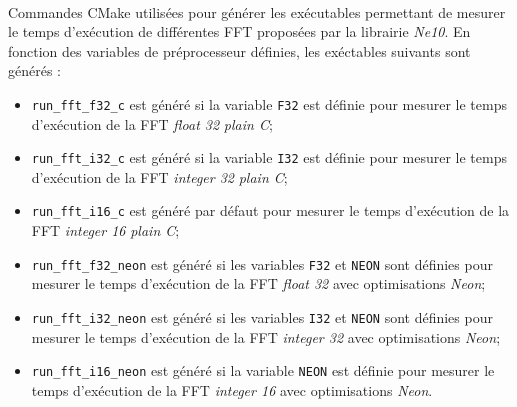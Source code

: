 \documentclass{article}
\begin{document}
\paragraph{}
Commandes CMake utilisées pour générer les exécutables permettant de mesurer le temps d'exécution de différentes FFT proposées par la librairie \emph{Ne10}. En fonction des variables de préprocesseur définies, les exéctables suivants sont générés :
\begin{itemize}
    \item \texttt{run\_fft\_f32\_c} est généré si la variable \texttt{F32} est définie pour mesurer le temps d'exécution de la FFT \emph{float 32} \emph{plain C};
    \item \texttt{run\_fft\_i32\_c} est généré si la variable \texttt{I32} est définie pour mesurer le temps d'exécution de la FFT \emph{integer 32} \emph{plain C};
    \item \texttt{run\_fft\_i16\_c} est généré par défaut pour mesurer le temps d'exécution de la FFT \emph{integer 16} \emph{plain C};
    \item \texttt{run\_fft\_f32\_neon} est généré si les variables \texttt{F32} et \texttt{NEON} sont définies pour mesurer le temps d'exécution de la FFT \emph{float 32} avec optimisations \emph{Neon};
    \item \texttt{run\_fft\_i32\_neon} est généré si les variables \texttt{I32} et \texttt{NEON} sont définies pour mesurer le temps d'exécution de la FFT \emph{integer 32} avec optimisations \emph{Neon};
    \item \texttt{run\_fft\_i16\_neon} est généré si la variable \texttt{NEON} est définie pour mesurer le temps d'exécution de la FFT \emph{integer 16} avec optimisations \emph{Neon}.
\end{itemize}
\lstset{language=make}
\end{document}
